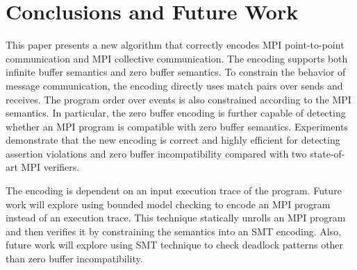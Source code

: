 \section{Conclusions and Future Work}
This paper presents a new algorithm that correctly encodes MPI point-to-point communication and MPI collective communication. The encoding supports both infinite buffer semantics and zero buffer semantics. To constrain the behavior of message communication, the encoding directly uses match pairs over sends and receives. The program order over events is also constrained according to the MPI semantics. In particular, the zero buffer encoding is further capable of detecting whether an MPI program is compatible with zero buffer semantics. Experiments demonstrate that the new encoding is correct and highly efficient for detecting assertion violations and zero buffer incompatibility compared with two state-of-art MPI verifiers. 

The encoding is dependent on an input execution trace of the program. Future work will explore using bounded model checking to encode an MPI program instead of an execution trace. This technique statically unrolls an MPI program and then verifies it by constraining the semantics into an SMT encoding. Also, future work will explore using SMT technique to check deadlock patterns other than zero buffer incompatibility.  